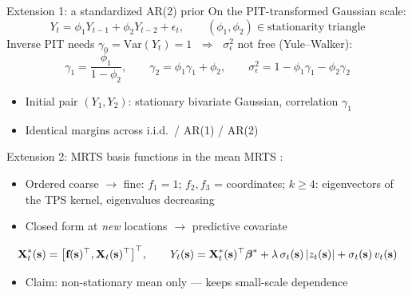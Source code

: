 \documentclass[12pt, aspectratio=169]{beamer}
\begin{document}
\begin{frame}{Extension 1: a standardized AR(2) prior}
  On the PIT-transformed Gaussian scale:
  \begin{equation*}
    Y_t = \phi_1 Y_{t-1} + \phi_2 Y_{t-2} + \epsilon_t,
    \qquad (\phi_1, \phi_2) \in \text{stationarity triangle}
  \end{equation*}
  Inverse PIT needs $\gamma_0 = \mathrm{Var}(Y_t) = 1$
  $\;\Rightarrow\;$ $\sigma^2_\epsilon$ \alert{not free} (Yule--Walker):
  \begin{equation*}
    \gamma_1 = \frac{\phi_1}{1 - \phi_2}, \qquad
    \gamma_2 = \phi_1 \gamma_1 + \phi_2, \qquad
    \sigma^2_\epsilon = 1 - \phi_1 \gamma_1 - \phi_2 \gamma_2
  \end{equation*}
  \bigskip
  \begin{itemize}
    \item Initial pair $(Y_1, Y_2)$: stationary bivariate Gaussian,
          correlation $\gamma_1$
    \item Identical margins across i.i.d.\ / AR(1) / AR(2)
  \end{itemize}
\end{frame}

\begin{frame}{Extension 2: MRTS basis functions in the mean}
  MRTS \parencite{tzeng_resolution_2018}:
  \begin{itemize}
    \item Ordered \alert{coarse $\to$ fine}: $f_1 = 1$; $f_2, f_3$ =
          coordinates; $k \ge 4$: eigenvectors of the TPS kernel,
          eigenvalues decreasing
    \item Closed form at \emph{new} locations $\to$ predictive covariate
  \end{itemize}
  \bigskip
  \begin{equation*}
    \mbox{\bf X}^*_t(\mbox{\bf s}) = \big[\mbox{\bf f}(\mbox{\bf s})^\top, \mbox{\bf X}_t(\mbox{\bf s})^\top\big]^\top,
    \qquad
    Y_t(\mbox{\bf s}) = \mbox{\bf X}^*_t(\mbox{\bf s})^\top \mbox{\boldmath $\beta$}^* + \lambda\,\sigma_t(\mbox{\bf s})\,|z_t(\mbox{\bf s})|
               + \sigma_t(\mbox{\bf s})\, v_t(\mbox{\bf s})
  \end{equation*}
  \bigskip
  \begin{itemize}
    \item Claim: non-stationary \alert{mean} only ---
          \Matern keeps small-scale dependence
  \end{itemize}
\end{frame}
\end{document}
